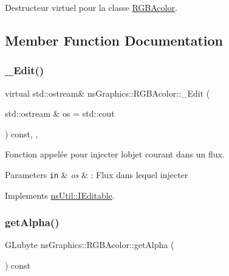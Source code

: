 Destructeur virtuel pour la classe \hyperlink{classns_graphics_1_1_r_g_b_acolor}{R\+G\+B\+Acolor}. 



\subsection{Member Function Documentation}
\mbox{\label{classns_graphics_1_1_r_g_b_acolor_add0c76f970c8617971ef8c5512335e88}} 
\subsubsection{\texorpdfstring{\+\_\+\+Edit()}{\_Edit()}}
{\footnotesize\ttfamily virtual std\+::ostream\& ns\+Graphics\+::\+R\+G\+B\+Acolor\+::\+\_\+\+Edit (\begin{DoxyParamCaption}\item[{std\+::ostream \&}]{os = {\ttfamily std\+:\+:cout} }\end{DoxyParamCaption}) const\hspace{0.3cm}{\ttfamily [override]}, {\ttfamily [protected]}, {\ttfamily [virtual]}}



Fonction appelée pour injecter l\textquotesingle{}objet courant dans un flux. 


\begin{DoxyParams}[1]{Parameters}
\mbox{\tt in}  & {\em os} & \+: Flux dans lequel injecter \\
\hline
\end{DoxyParams}


Implements \hyperlink{classns_util_1_1_i_editable_ab20bbe582b95383ed3f1453109035853}{ns\+Util\+::\+I\+Editable}.

\mbox{\label{classns_graphics_1_1_r_g_b_acolor_a76299c507a113e326c01fe4b0bca2b1e}} 
\subsubsection{\texorpdfstring{get\+Alpha()}{getAlpha()}}
{\footnotesize\ttfamily G\+Lubyte ns\+Graphics\+::\+R\+G\+B\+Acolor\+::get\+Alpha (\begin{DoxyParamCaption}{ }\end{DoxyParamCaption}) const}



